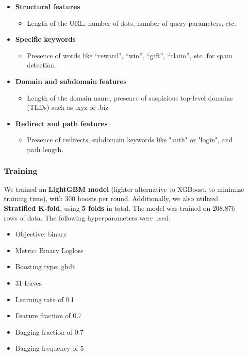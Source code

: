 \documentclass{article}
\begin{document}
\begin{itemize}
    \item \textbf{Structural features}
        \begin{itemize}
        \item Length of the URL, number of dots, number of query parameters, etc.
        \end{itemize}
    \item \textbf{Specific keywords}
        \begin{itemize}
        \item Presence of words like “reward”, “win”, “gift”, “claim”, etc. for spam detection.
        \end{itemize}
    \item \textbf{Domain and subdomain features}
        \begin{itemize}
        \item Length of the domain name, presence of suspicious top-level domains (TLDs) such as .xyz or .biz
        \end{itemize}
    \item \textbf{Redirect and path features}
        \begin{itemize}
            \item Presence of redirects, subdomain keywords like "auth" or "login", and path length.
        \end{itemize}
\end{itemize}

\subsubsection*{Training}

\noindent
We trained an \textbf{LightGBM model} (lighter alternative to XGBoost, to minimize training time), with 300 boosts per round. Additionally, we also utilized \textbf{Stratified K-fold}, using \textbf{5 folds} in total. The model was trained on 208,876 rows of data. The following hyperparameters were used: 

\begin{itemize}
    \item Objective: binary
    \item Metric: Binary Logloss
    \item Boosting type: gbdt
    \item 31 leaves
    \item Learning rate of 0.1
    \item Feature fraction of 0.7
    \item Bagging fraction of 0.7
    \item Bagging frequency of 5
\end{itemize}
\end{document}
